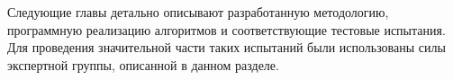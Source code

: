 Следующие главы детально описывают разработанную методологию, программную реализацию алгоритмов и соответствующие тестовые испытания. Для проведения значительной части таких испытаний были использованы силы экспертной группы, описанной в данном разделе.



